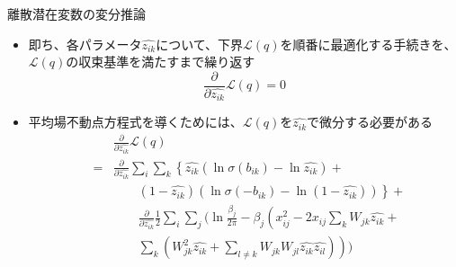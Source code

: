 \documentclass[dvipdfmx,notheorems,t]{beamer}
\begin{document}
\begin{frame}{離散潜在変数の変分推論}
\begin{itemize}
\begin{itemize}
		\item 即ち、各パラメータ$\widehat{z_{ik}}$について、下界$\mathcal{L}(q)$を順番に最適化する手続きを、\color{red}$\mathcal{L}(q)$の収束基準を満たすまで繰り返す\normalcolor
		\begin{equation}
			\frac{\partial}{\partial \widehat{z_{ik}}} \mathcal{L}(q) = 0
		\end{equation}
		
		\item 平均場不動点方程式を導くためには、$\mathcal{L}(q)$を$\widehat{z_{ik}}$で微分する必要がある
		\begin{eqnarray}
			&& \frac{\partial}{\partial \widehat{z_{ik}}} \mathcal{L}(q) \nonumber \\
			&=& \frac{\partial}{\partial \widehat{z_{ik}}} \sum_i \sum_k \left\{ \widehat{z_{ik}} \left( \ln \sigma(b_{ik}) - \ln \widehat{z_{ik}} \right) + \right. \nonumber \\
			&& \qquad \left. \left( 1 - \widehat{z_{ik}} \right) \left( \ln \sigma(-b_{ik}) - \ln \left( 1 - \widehat{z_{ik}} \right) \right) \right\} + \nonumber \\
			&& \qquad \frac{\partial}{\partial \widehat{z_{ik}}} \frac{1}{2} \sum_i \sum_j \Bigg( \ln \frac{\beta_j}{2\pi} - \beta_j \left( x_{ij}^2 - 2 x_{ij} \sum_k W_{jk} \widehat{z_{ik}} + \right. \nonumber \\
			&& \qquad \left. \sum_k \left( W_{jk}^2 \widehat{z_{ik}} + \sum_{l \neq k} W_{jk} W_{jl} \widehat{z_{ik}} \widehat{z_{il}} \right) \right) \Bigg)
		\end{eqnarray}
		

\end{itemize}
\end{itemize}
\end{frame}
\end{document}
